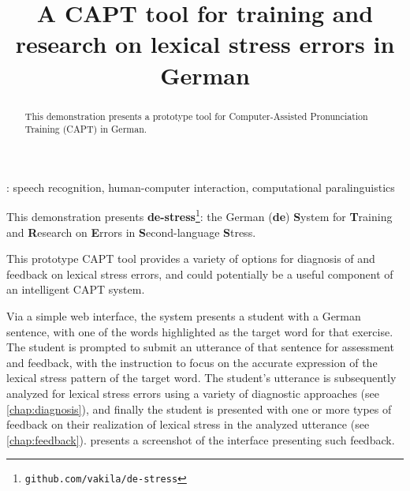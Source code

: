 \documentclass[a4paper]{article}
\title{A CAPT tool for training and research on lexical stress errors in German}
\begin{document}
  \maketitle
  \begin{abstract}
    This demonstration presents a prototype tool for Computer-Assisted Pronunciation Training (CAPT) in German.  
  \end{abstract}
  : speech recognition, human-computer interaction, computational paralinguistics


	
	This demonstration presents \textbf{de-stress}\footnote{\texttt{github.com/vakila/de-stress}}: the German (\textbf{de}) \textbf{S}ystem for \textbf{T}raining and \textbf{R}esearch on \textbf{E}rrors in \textbf{S}econd-language \textbf{S}tress. 
%

This prototype CAPT tool provides a variety of options for diagnosis of and feedback on lexical stress errors, and could potentially be a useful component of an intelligent CAPT system. 



 Via a simple web interface, the system presents a student with a German sentence,
 with one of the words highlighted as the target word for that exercise. The student is prompted to submit an utterance of that sentence for assessment and feedback, with the instruction to focus on the accurate expression of the lexical stress pattern of the target word. The student's utterance is subsequently analyzed for lexical stress errors using a variety of diagnostic approaches (see \cref{chap:diagnosis}), and finally the student is presented with one or more types of feedback on their realization of lexical stress in the analyzed utterance (see \cref{chap:feedback}).  presents a screenshot of the interface presenting such feedback.
\end{document}
